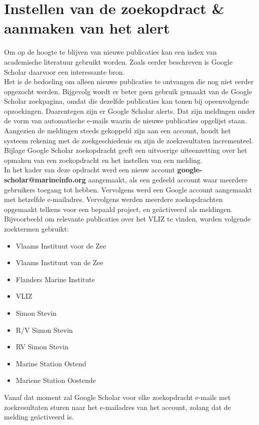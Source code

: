 \section{Instellen van de zoekopdract \& aanmaken van het alert}
Om op de hoogte te blijven van nieuwe publicaties kan een index van academische literatuur gebruikt worden. Zoals eerder beschreven is Google Scholar daarvoor een interessante bron.\\
Het is de bedoeling om alleen nieuwe publicaties te ontvangen die nog niet eerder opgezocht werden. Bijgevolg wordt er beter geen gebruik gemaakt van de Google Scholar zoekpagina, omdat die dezelfde publicaties kan tonen bij opeenvolgende opzoekingen. Daarentegen zijn er Google Scholar alerts. Dat zijn meldingen onder de vorm van automatische e-mails waarin de nieuwe publicaties opgelijst staan. Aangezien de meldingen steeds gekoppeld zijn aan een account, houdt het systeem rekening met de zoekgeschiedenis en zijn de zoekresultaten incrementeel.\\
Bijlage Google Scholar zoekopdracht geeft een uitvoerige uiteenzetting over het opmaken van een zoekopdracht en het instellen van een melding.\\
In het kader van deze opdracht werd een nieuw account \textbf{google-scholar@marineinfo.org} aangemaakt, als een gedeeld account waar meerdere gebruikers toegang tot hebben. Vervolgens werd een Google account aangemaakt met hetzelfde e-mailadres. Vervolgens werden meerdere zoekopdrachten opgemaakt telkens voor een bepaald project, en geäctiveerd als meldingen.
Bijvoorbeeld om relevante publicaties over het VLIZ te vinden, worden volgende zoektermen gebruikt:
\begin{itemize}
    \item Vlaams Instituut voor de Zee
    \item Vlaams Instituut van de Zee
    \item Flanders Marine Institute
    \item VLIZ
    \item Simon Stevin
    \item R/V Simon Stevin
    \item RV Simon Stevin
    \item Marine Station Ostend
    \item Mariene Station Oostende
\end{itemize}

Vanaf dat moment zal Google Scholar voor elke zoekopdracht e-mails met zoekresultaten sturen naar het e-mailadres van het account, zolang dat de melding geäctiveerd is.